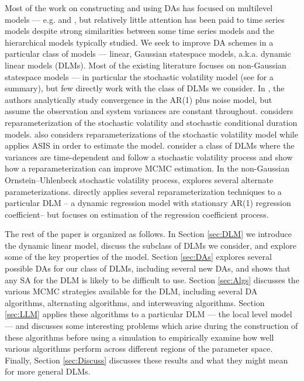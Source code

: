 \documentclass{article}
\begin{document}
Most of the work on constructing and using DAs has focused on multilevel models --- e.g.  and , but relatively little attention has been paid to time series models despite strong similarities between some time series models and the hierarchical models typically studied. We seek to improve DA schemes in a particular class of models --- linear, Gaussian statespace models, a.k.a. dynamic linear models (DLMs). Most of the existing literature focuses on non-Gaussian statespace models --- in particular the stochastic volatility model (see  for a summary), but few directly work with the class of DLMs we consider. In , the authors analytically study convergence in the AR(1) plus noise model, but assume the observation and system variances are constant throughout.  considers reparameterization of the stochastic volatility and stochastic conditional duration models.  also considers reparameterizations of the stochastic volatility model while  applies ASIS in order to estimate the model.  consider a class of DLMs where the variances are time-dependent and follow a stochastic volatility process and show how a reparameterization can improve MCMC estimation. In the non-Gaussian Ornstein--Uhlenbeck stochastic volatility process,  explores several alternate parameterizations.  directly applies several reparameterization techniques to a particular DLM -- a dynamic regression model with stationary AR(1) regression coefficient-- but focuses on estimation of the regression coefficient process.

The rest of the paper is organized as follows. In Section \ref{sec:DLM} we introduce the dynamic linear model, discuss the subclass of DLMs we consider, and explore some of the key properties of the model. Section \ref{sec:DAs} explores several possible DAs for our class of DLMs, including several new DAs, and shows that any SA for the DLM is likely to be difficult to use. Section \ref{sec:Algs} discusses the various MCMC strategies available for the DLM, including several DA algorithms, alternating algorithms, and interweaving algorithms. Section \ref{sec:LLM} applies these algorithms to a particular DLM --- the local level model --- and discusses some interesting problems which arise during the construction of these algorithms before using a simulation to empirically examine how well various algorithms perform across different regions of the parameter space. Finally, Section \ref{sec:Discuss} discusses these results and what they might mean for more general DLMs.
\end{document}
